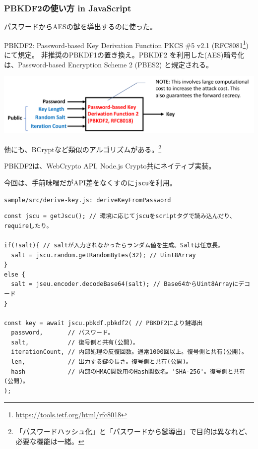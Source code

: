\documentclass[12pt,dvipdfmx]{beamer}
\begin{document}
\begin{frame}
\frametitle{PBKDF2の使い方 in JavaScript}
パスワードからAESの鍵を導出するのに使った。
\begin{block}{\small PBKDF2: Password-based Key Derivation Function}
PKCS \#5 v2.1 (RFC8081\footnote[frame]{\scriptsize \url{https://tools.ietf.org/html/rfc8018}}) にて規定。
非推奨のPBKDF1の置き換え。PBKDF2 を利用した(AES)暗号化は、Password-based Encryption Scheme 2 (PBES2) と規定される。
\end{block}

\begin{center}
\includegraphics[width=\linewidth]{Figs/kdf_pbkdf2_flow.pdf}
\end{center}
他にも、BCryptなど類似のアルゴリズムがある。\footnote[frame]{\scriptsize 「パスワードハッシュ化」と「パスワードから鍵導出」で目的は異なれど、必要な機能は一緒。}
\end{frame}

\begin{frame}[fragile]
PBKDF2は、WebCrypto API, Node.js Crypto共にネイティブ実装。

今回は、手前味噌だがAPI差をなくすのに\texttt{jscu}を利用。

\begin{exampleblock}{\small \texttt{sample/src/derive-key.js: deriveKeyFromPassword}}
\scriptsize
\begin{verbatim}
const jscu = getJscu(); // 環境に応じてjscuをscriptタグで読み込んだり、requireしたり。

if(!salt){ // saltが入力されなかったらランダム値を生成。Saltは任意長。
  salt = jscu.random.getRandomBytes(32); // Uint8Array
}
else {
  salt = jseu.encoder.decodeBase64(salt); // Base64からUint8Arrayにデコード
}

const key = await jscu.pbkdf.pbkdf2( // PBKDF2により鍵導出
  password,       // パスワード。
  salt,           // 復号側と共有(公開)。
  iterationCount, // 内部処理の反復回数。通常1000回以上。復号側と共有(公開)。
  len,            // 出力する鍵の長さ。復号側と共有(公開)。
  hash            // 内部のHMAC関数用のHash関数名。'SHA-256'。復号側と共有(公開)。
);
\end{verbatim}
\end{exampleblock}
\end{frame}
\end{document}
